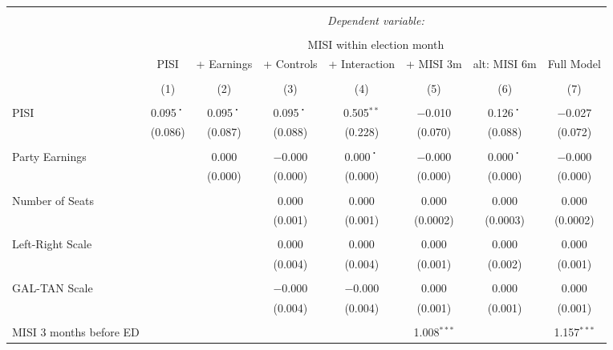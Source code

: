 
\begin{table}[!htbp] \centering 
  \caption{} 
  \label{} 
\begin{tabular}{@{\extracolsep{5pt}}lccccccc} 
\\[-1.8ex]\hline 
\hline \\[-1.8ex] 
 & \multicolumn{7}{c}{\textit{Dependent variable:}} \\ 
\cline{2-8} 
\\[-1.8ex] & \multicolumn{7}{c}{MISI within election month} \\ 
 & PISI & + Earnings & + Controls & + Interaction & + MISI 3m & alt: MISI 6m & Full Model \\ 
\\[-1.8ex] & (1) & (2) & (3) & (4) & (5) & (6) & (7)\\ 
\hline \\[-1.8ex] 
 PISI & 0.095$^{・}$ & 0.095$^{・}$ & 0.095$^{・}$ & 0.505$^{**}$ & $-$0.010 & 0.126$^{・}$ & $-$0.027 \\ 
  & (0.086) & (0.087) & (0.088) & (0.228) & (0.070) & (0.088) & (0.072) \\ 
  & & & & & & & \\ 
 Party Earnings &  & 0.000 & $-$0.000 & 0.000$^{・}$ & $-$0.000 & 0.000$^{・}$ & $-$0.000 \\ 
  &  & (0.000) & (0.000) & (0.000) & (0.000) & (0.000) & (0.000) \\ 
  & & & & & & & \\ 
 Number of Seats &  &  & 0.000 & 0.000 & 0.000 & 0.000 & 0.000 \\ 
  &  &  & (0.001) & (0.001) & (0.0002) & (0.0003) & (0.0002) \\ 
  & & & & & & & \\ 
 Left-Right Scale &  &  & 0.000 & 0.000 & 0.000 & 0.000 & 0.000 \\ 
  &  &  & (0.004) & (0.004) & (0.001) & (0.002) & (0.001) \\ 
  & & & & & & & \\ 
 GAL-TAN Scale &  &  & $-$0.000 & $-$0.000 & 0.000 & 0.000 & 0.000 \\ 
  &  &  & (0.004) & (0.004) & (0.001) & (0.001) & (0.001) \\ 
  & & & & & & & \\ 
 MISI 3 months before ED &  &  &  &  & 1.008$^{***}$ &  & 1.157$^{***}$ \\ 

\end{tabular}
\end{table}
